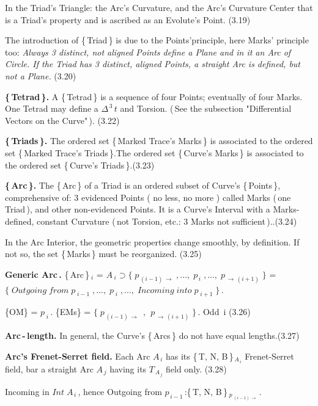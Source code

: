 \documentclass[12pt]{article} %
\begin{document}
\noindent In the Triad's Triangle: the Arc's Curvature, and the Arc's Curvature Center that is a Triad's property and is ascribed as an Evolute's Point. \qquad \qquad (3.19) 

\noindent The introduction of \{\,Triad\,\} is due to the Points'principle, here Marks' principle too: \textsl{Always 3 distinct, not aligned Points define a Plane and in it an Arc of Circle. If the Triad has 3 distinct, aligned Points, a straight Arc is defined, but not a Plane.} (3.20)

\noindent \textbf{\{\,Tetrad\,\}.} A \{\,Tetrad\,\} is a sequence of four Points; eventually of four Marks. One Tetrad may define a $\Delta^{\,3}\,t$ and Torsion. (\,See the subsection "Differential Vectors on the Curve"\,).  (3.22)
 
 \noindent \textbf{\{\,Triads\,\}.} The ordered set \{\,Marked Trace's Marks\,\} is associated to the ordered set \{\,Marked Trace's Triads\,\}.The ordered set \{\,Curve's Marks\,\} is associated to the ordered set \{\,Curve's Triads\,\}.\qquad \qquad (3.23)

\noindent \textbf{\{\,Arc\,\}.} The \{\,Arc\,\} of a Triad is an ordered subset of Curve's \{\,Points\,\}, comprehensive of: 3 evidenced Points ( no less, no more ) called Marks (\,one Triad\,), and other non-evidenced Points. It is a Curve's Interval with a Marks-defined, constant Curvature (\,not Torsion, etc.: 3 Marks not sufficient\,)..\qquad (3.24)

\noindent In the Arc Interior, the geometric properties change smoothly, by definition. If not so, the set \{\,Marks\,\} must be reorganized. \qquad (3.25) 

\noindent \textbf{Generic Arc\,.} \;\{\,Arc\,\}$_{\;i}$ = $A_{\;i} \supset \{\;p_{\,(i-1)\,\to}\;, ... ,\;p_{\,i}\;, ... ,\;p_{\,\to\,(i+1)}\;\}$ = $\{\;Outgoing\;from\;p_{\;i-1}\;, ... ,\;p_{\;i}\;, ... ,\;Incoming\;into\;p_{\;i+1}\;\}$\,.

\noindent \{OM\} = $p_{\;i}$\,. \{EMs\} = $\{\;p_{\,(i-1)\,\to}\;\,,\,\;p_{\,\to\,(i+1)}\;\}$\,. Odd\, i \qquad \qquad \qquad (3.26)

\noindent \textbf{Arc\,-\,length.} In general, the Curve's \{\,Arcs\,\} do not have equal lengths.\qquad (3.27)

\noindent \textbf{Arc's Frenet-Serret field.} Each Arc $A_{\,i}$ has its \{\,T, N, B\,\}$_{\,A_{\,i}}$ Frenet-Serret field, bar a straight Arc $A_{\,j}$ having its $T_{\,A_{\,j}}$ field only.  (3.28)

\noindent Incoming in $Int\;A_{\,i}$\,, hence Outgoing from $p_{\,i-1}$\,:\qquad \{\,T, N, B\,\}$_{\;p_{\;(i-1)\,\to}}$\,. 
\end{document}
